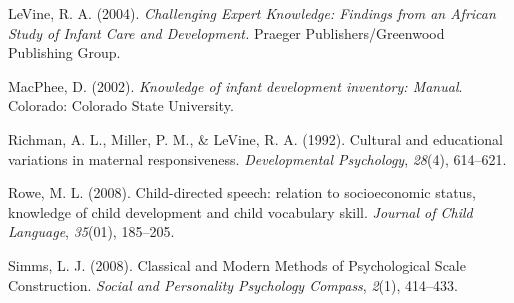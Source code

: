\documentclass[floatsintext,man]{apa6}
\theoremstyle{definition}
\theoremstyle{definition}
\theoremstyle{definition}
\theoremstyle{remark}
\begin{document}
\hypertarget{ref-levine2004}{}
LeVine, R. A. (2004). \emph{Challenging Expert Knowledge: Findings from
an African Study of Infant Care and Development.} Praeger
Publishers/Greenwood Publishing Group.

\hypertarget{ref-macphee2002}{}
MacPhee, D. (2002). \emph{Knowledge of infant development inventory:
Manual}. Colorado: Colorado State University.

\hypertarget{ref-richman1992}{}
Richman, A. L., Miller, P. M., \& LeVine, R. A. (1992). Cultural and
educational variations in maternal responsiveness. \emph{Developmental
Psychology}, \emph{28}(4), 614--621.

\hypertarget{ref-rowe2008}{}
Rowe, M. L. (2008). Child-directed speech: relation to socioeconomic
status, knowledge of child development and child vocabulary skill.
\emph{Journal of Child Language}, \emph{35}(01), 185--205.

\hypertarget{ref-simms2008}{}
Simms, L. J. (2008). Classical and Modern Methods of Psychological Scale
Construction. \emph{Social and Personality Psychology Compass},
\emph{2}(1), 414--433.

\endgroup
\end{document}
